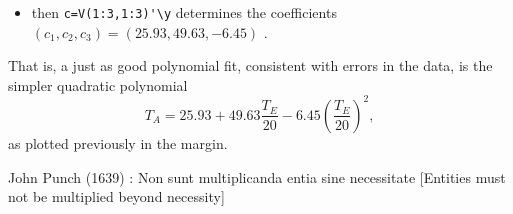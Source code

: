 \begin{example}
\begin{solution}
\begin{enumerate}
\begin{itemize}
\item then \verb|c=V(1:3,1:3)'\y| determines the coefficients \((c_1,c_2,c_3)=(25.93,49.63,-6.45)\) \twodp.
\end{itemize}
That is, a just as good polynomial fit, consistent with errors in the data, is the simpler quadratic polynomial
\begin{equation*}
T_A=25.93+49.63\frac{T_E}{20} 
-6.45\left(\frac{T_E}{20}\right)^2,
\end{equation*}
as plotted previously in the margin.
\end{enumerate}
\end{solution}
\end{example}



\begin{quoted}{John Punch (1639)}
: Non sunt multiplicanda entia sine necessitate
[Entities must not be multiplied beyond necessity]
\end{quoted}
\begin{comment}
``We consider it a good principle to explain the phenomena by the simplest hypothesis possible." Ptolemy (c.\textsc{ad}90--168)
\end{comment}






